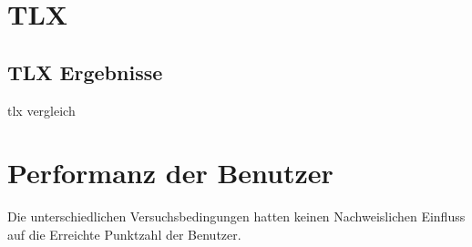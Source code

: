 \section{TLX}


\subsection{TLX Ergebnisse}
\cite{Abtahi2019}
tlx vergleich

\section{Performanz der Benutzer}
Die unterschiedlichen Versuchsbedingungen hatten keinen Nachweislichen Einfluss auf die Erreichte Punktzahl der Benutzer.
















